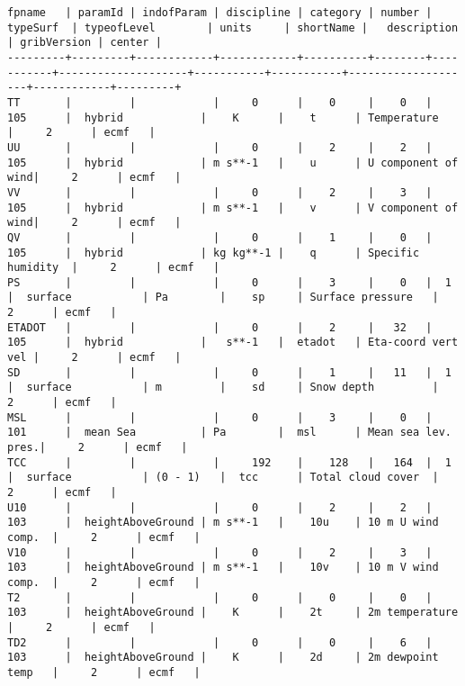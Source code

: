 \documentclass{egu}                  %
\begin{document}
\begin{landscape} 
\begin{scriptsize}\begin{verbatim}
fpname   | paramId | indofParam | discipline | category | number | typeSurf  | typeofLevel        | units     | shortName |   description      | gribVersion | center |
---------+---------+------------+------------+----------+--------+-----------+--------------------+-----------+-----------+--------------------+------------+---------+
TT       |         |            |     0      |    0     |    0   |  105      |  hybrid            |    K      |    t      | Temperature        |     2      | ecmf   |
UU       |         |            |     0      |    2     |    2   |  105      |  hybrid            | m s**-1   |    u      | U component of wind|     2      | ecmf   |
VV       |         |            |     0      |    2     |    3   |  105      |  hybrid            | m s**-1   |    v      | V component of wind|     2      | ecmf   |
QV       |         |            |     0      |    1     |    0   |  105      |  hybrid            | kg kg**-1 |    q      | Specific humidity  |     2      | ecmf   |
PS       |         |            |     0      |    3     |    0   |  1        |  surface           | Pa        |    sp     | Surface pressure   |     2      | ecmf   |
ETADOT   |         |            |     0      |    2     |   32   |  105      |  hybrid            |   s**-1   |  etadot   | Eta-coord vert vel |     2      | ecmf   |
SD       |         |            |     0      |    1     |   11   |  1        |  surface           | m         |    sd     | Snow depth         |     2      | ecmf   |
MSL      |         |            |     0      |    3     |    0   |  101      |  mean Sea          | Pa        |  msl      | Mean sea lev. pres.|     2      | ecmf   |
TCC      |         |            |     192    |    128   |   164  |  1        |  surface           | (0 - 1)   |  tcc      | Total cloud cover  |     2      | ecmf   |
U10      |         |            |     0      |    2     |    2   |  103      |  heightAboveGround | m s**-1   |    10u    | 10 m U wind comp.  |     2      | ecmf   |
V10      |         |            |     0      |    2     |    3   |  103      |  heightAboveGround | m s**-1   |    10v    | 10 m V wind comp.  |     2      | ecmf   |
T2       |         |            |     0      |    0     |    0   |  103      |  heightAboveGround |    K      |    2t     | 2m temperature     |     2      | ecmf   |  
TD2      |         |            |     0      |    0     |    6   |  103      |  heightAboveGround |    K      |    2d     | 2m dewpoint temp   |     2      | ecmf   |

\end{verbatim}
\end{scriptsize}
\end{landscape}
\end{document}
